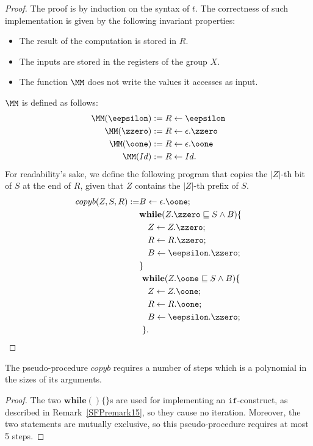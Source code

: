 \begin{proof}
The proof is by induction on the syntax of $t$.
The correctness of such implementation
is given by the following invariant properties:

\begin{itemize}
\item The result of the computation is
stored in $R$.
%
\item The inputs are stored in the registers
of the group $X$.
%
\item The function $\MM$ does not write
the values it accesses as input.
\end{itemize}
$\MM$ is defined as follows:
\begin{align*}
\MM({\eepsilon}) &:=
R\leftarrow {\eepsilon} \\
%
\MM({\zzero}) &:=
R \leftarrow {\epsilon.\zzero} \\
%
\MM({\oone}) &:=
R \leftarrow {\epsilon.\oone} \\
%
\MM(Id) &:= R \leftarrow Id.
\end{align*}
%
%
For readability's sake, we define the following
program that copies
the $|Z|$-th bit of $S$
at the end of $R$, given that
$Z$ contains the $|Z|$-th prefix of $S$.
\begin{align*}
{copyb(Z,S,R)} := &B \leftarrow {\epsilon.\oone}; \\
%
& \mathbf{while}(Z.{\zzero}
\sqsubseteq S \wedge B) \{ \\
%
& \ \ \ Z \leftarrow Z.{\zzero}; \\
%
& \ \ \ R \leftarrow R.{\zzero}; \\
%
& \ \ \ B \leftarrow {\eepsilon.\zzero}; \\
%
& \} \\
%
& \ \mathbf{while}(Z.{\oone}
\sqsubseteq S \wedge B) \{ \\
%
& \ \ \ Z \leftarrow Z.{\oone}; \\
%
& \ \ \ R \leftarrow R.{\oone}; \\
%
& \ \ \ B \leftarrow {\eepsilon.\zzero}; \\
%
& \ \}.
\end{align*}
\end{proof}








\begin{lemma}\label{lemma:copyComp}
The pseudo-procedure $copyb$ requires
a number of steps which
is a polynomial in the sizes of its arguments.
\end{lemma}
\begin{proof}
The two $\mathbf{while}()\{\}$s
are used for implementing an $\mathtt{if}$-construct,
as described in Remark~\ref{SFPremark15},
so they cause no iteration.
Moreover, the two statements are mutually exclusive,
so this pseudo-procedure requires at most 5 steps.
\end{proof}




